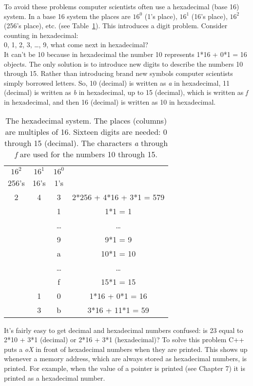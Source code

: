 To avoid these problems computer scientists often use a hexadecimal (base 16) system.  In a base 16 system the places are $16^{0}$ (1's place), $16^{1}$ (16's place), $16^{2}$ (256's place), etc. (see Table~\ref{tab:hexadecimal}).  This introduces a digit problem.  Consider counting in hexadecimal: \\
0, 1, 2, 3, \dots, 9, what come next in hexadecimal?  \\
It can't be 10 because in hexadecimal the number 10 represents 1*16 + 0*1 = 16 objects.  The only solution is to introduce new digits to describe the numbers 10 through 15.  Rather than introducing brand new symbols computer scientists simply borrowed letters.  So, 10 (decimal) is written as \emph{a} in hexadecimal, 11 (decimal) is written as \emph{b} in hexadecimal, up to 15 (decimal), which is written as \emph{f} in hexadecimal, and then 16 (decimal) is written as 10 in hexadecimal.


\begin{table}
\centering
\begin{tabular}{ c | c | c || c  }
$16^{2}$ &$16^1$&$16^0$&\\
   256's & 16's & 1's & \\
\hline
   2 & 4 & 3 & 2*256 + 4*16 + 3*1 = 579 \\
& & 1 & 1*1 = 1\\
& & \ldots & \dots\\
& & 9 & 9*1 = 9 \\
& & a & 10*1 = 10\\
& & \dots & \ldots\\
& & f & 15*1 = 15 \\
& 1 & 0 & 1*16 + 0*1 = 16\\
& 3 & b & 3*16 + 11*1 = 59\\
\end{tabular}
\caption{The hexadecimal system.  The places (columns) are multiples of 16.  Sixteen digits are needed: 0 through 15 (decimal).  The characters \emph{a} through \emph{f} are used for the numbers 10 through 15.}\label{tab:hexadecimal}
\end{table}

It's fairly easy to get decimal and hexadecimal numbers confused: is 23 equal to 2*10 + 3*1 (decimal) or 2*16 + 3*1 (hexadecimal)?  To solve this problem C++ puts a \emph{oX} in front of hexadecimal numbers when they are printed. This shows up whenever a memory address, which are always stored as hexadecimal numbers, is printed.  For example, when the value of a pointer is printed (see Chapter 7) it is printed as a hexadecimal number.

